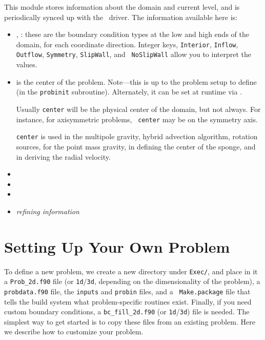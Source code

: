 \begin{itemize}
  This module stores information about the domain and current level,
  and is periodically synced up with the \cpp\ driver.  The information
  available here is:
  \begin{itemize}
  \item {}, : these are the boundary
    condition types at the low and high ends of the domain, for each
    coordinate direction.  Integer keys, {\tt Interior}, {\tt Inflow},
    {\tt Outflow}, {\tt Symmetry}, {\tt SlipWall}, and {\tt
      NoSlipWall} allow you to interpret the values.

  \item {} is the center of the problem.  Note---this is up
    to the problem setup to define (in the {\tt probinit} subroutine).
    Alternately, it can be set at runtime via
    . 

    Usually {\tt center} will be the physical center of the domain,
    but not always.  For instance, for axisymmetric problems, {\tt
      center} may be on the symmetry axis.

    {\tt center} is used in the multipole gravity, hybrid advection
    algorithm, rotation sources, for the point mass gravity, in
    defining the center of the sponge, and in deriving the radial
    velocity.  

  \item {}

  \item {}

  \item {}

  \item {\em refining information}

  \end{itemize}

\end{itemize}



\section{Setting Up Your Own Problem}

To define a new problem, we create a new directory under {\tt Exec/},
and place in it a {\tt Prob\_2d.f90} file (or {\tt 1d}/{\tt 3d},
depending on the dimensionality of the problem), a {\tt probdata.f90}
file, the {\tt inputs} and {\tt probin} files, and a {\tt
  Make.package} file that tells the build system what problem-specific
routines exist.  Finally, if you need custom boundary conditions, a
{\tt bc\_fill\_2d.f90} (or {\tt 1d}/{\tt 3d}) file is needed.  The
simplest way to get started is to copy these files from an existing
problem.  Here we describe how to customize your problem.


